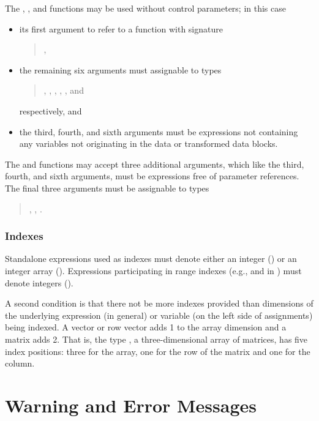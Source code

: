 The , , and
 functions may be used without control
parameters;  in this case
%
\begin{itemize}
\item its first argument to refer to a function with signature
\begin{quote}
 ,
\end{quote}
\item the remaining six arguments must assignable to types
\begin{quote}
  , , , ,
, and 
\end{quote}
 respectively, and
\item the third, fourth, and sixth arguments must be expressions not
  containing any variables not originating in the data or transformed
  data blocks.
\end{itemize}
%
The  and 
functions may accept three additional arguments, which like the third,
fourth, and sixth arguments, must be expressions free of parameter
references.  The final three arguments must be assignable to types
\begin{quote}
, , .
\end{quote}

\subsection{Indexes}

Standalone expressions used as indexes must denote either an integer
() or an integer array ().  Expressions
participating in range indexes (e.g.,  and  in
) must denote integers ().

A second condition is that there not be more indexes provided than
dimensions of the underlying expression (in general) or variable (on
the left side of assignments) being indexed.  A vector or row vector
adds 1 to the array dimension and a matrix adds 2.  That is, the type
, a three-dimensional array of matrices, has five
index positions: three for the array, one for the row of the matrix
and one for the column.

\chapter{Warning and Error Messages}\label{error-messages.appendix}

